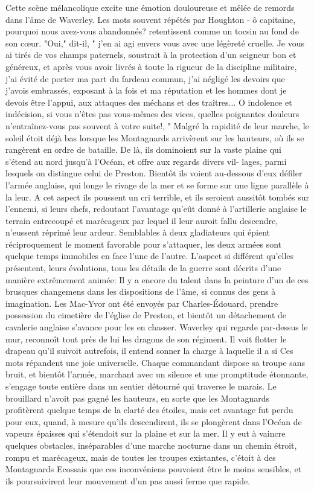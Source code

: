 {Cette scène mélancolique excite une émotion douloureuse et mêlée de remords dans l'âme de Waverley. Les mots souvent répétés par Houghton - ô capitaine, pourquoi nous avez-vous abandonnés? retentissent comme un tocsin au fond de son cœur. "Oui," dit-il, " j'en ai agi envers vous avec une légèreté cruelle. Je vous ai tirés de vos champs paternels, soustrait à la protection d'un seigneur bon et généreux, et après vous avoir livrés à toute la rigueur de la discipline militaire, j'ai évité de porter ma part du fardeau commun, j'ai négligé les devoirs que j'avois embrassés, exposant à la fois et ma réputation et les hommes dont je devois être l'appui, aux attaques des méchans et des traîtres... O indolence et indécision, si vous n'êtes pas vous-mêmes des vices, quelles poignantes douleurs n'entraînez-vous pas souvent à votre suite!, "
Malgré la rapidité de leur marche, le soleil étoit déjà bas lorsque les Montagnards arrivèrent sur les hauteurs, où ils se rangèrent en ordre de bataille. De là, ils dominoient sur la vaste plaine qui s'étend au nord jusqu'à l'Océan, et offre aux regards divers vil-\setcounter{page}{239} lages, parmi lesquels on distingue celui de Preston. Bientôt ils voient au-dessous d'eux défiler l'armée anglaise, qui longe le rivage de la mer et se forme sur une ligne parallèle à la leur. A cet aspect ils poussent un cri terrible, et ils seroient aussitôt tombés sur l'ennemi, si leurs chefs, redoutant l'avantage qu'eût donné à l'artillerie anglaise le terrain entrecoupé et marécageux par lequel il leur auroit fallu descendre, n'eussent réprimé leur ardeur. Semblables à deux gladiateurs qui épient réciproquement le moment favorable pour s'attaquer, les deux armées sont quelque temps immobiles en face l'une de l'autre. L'aspect si différent qu'elles présentent, leurs évolutions, tous les détails de la guerre sont décrits d'une manière extrêmement animée: Il y a encore du talent dans la peinture d'un de ces brusques changemens dans les dispositions de l'âme, si connus des gens à imagination. Les Mac-Yvor ont été envoyés par Charles-Édouard, prendre possession du cimetière de l'église de Preston, et bientôt un détachement de cavalerie anglaise s'avance pour les en chasser. Waverley qui regarde par-dessus le mur, reconnoît tout près de lui les dragons de son régiment. Il voit flotter le drapeau qu'il suivoit autrefois, il entend sonner la charge à laquelle il a si\setcounter{page}{242} Ces mots répandent une joie universelle. Chaque commandant dispose sa troupe sans bruit, et bientôt l'armée, marchant avec un silence et une promptitude étonnante, s'engage toute entière dans un sentier détourné qui traverse le marais. Le brouillard n'avoit pas gagné les hauteurs, en sorte que les Montagnards profitèrent quelque temps de la clarté des étoiles, mais cet avantage fut perdu pour eux, quand, à mesure qu'ils descendirent, ils se plongèrent dans l'Océan de vapeurs épaisses qui s'étendoit sur la plaine et sur la mer. Il y eut à vaincre quelques obstacles, inséparables d'une marche nocturne dans un chemin étroit, rompu et marécageux, mais de toutes les troupes existantes, c'étoit à des Montagnards Ecossais que ces inconvéniens pouvoient être le moins sensibles, et ils poursuivirent leur mouvement d'un pas aussi ferme que rapide.
}

